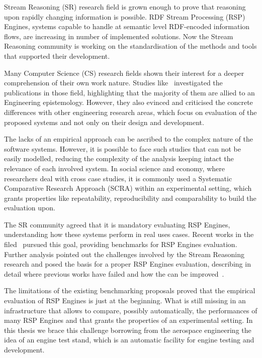 Stream Reasoning (SR) research field is grown enough to prove that reasoning upon rapidly changing information is possible. RDF Stream Processing (RSP) Engines, systems capable to handle at semantic level RDF-encoded information flows, are increasing in number of implemented solutions. Now the Stream Reasoning community is working on the standardisation of the methods and tools that supported their development. 

Many Computer Science (CS) research fields shown their interest for a deeper comprehension of their own work nature. Studies like~\cite{Tichy:1995:EEC:209090.209093, Wainer:2009:EEC:1518331.1518552} investigated the publications in those field, highlighting that the majority of them are allied to an Engineering epistemology. However, they also evinced and criticised the concrete differences with other engineering research areas, which focus on evaluation of the proposed systems and not only on their design and development. 

The lacks of an empirical approach can be ascribed to the complex nature of the software systems. However, it is possible to face such studies that can not be easily modelled, reducing the complexity of the analysis keeping intact the relevance of each involved system. In social science and economy, where researchers deal with cross case studies, it is commonly used a Systematic Comparative Research Approach (SCRA) within an experimental setting, which grants properties like repeatability, reproducibility and comparability to build the evaluation upon.

The SR community agreed that it is mandatory evaluating RSP Engines, understanding how these systems perform in real uses cases. Recent works in the filed~\cite{Zhang2012, LePhuoc2012c, DBLP:conf/semweb/DellAglioCBCV13} pursued this goal, providing benchmarks for RSP Engines evaluation. Further analysis pointed out the challenges involved by the Stream Reasoning research and posed the basis for a proper RSP Engines evaluation, describing in detail where previous works have failed and how the can be improved~\cite{DBLP:conf/esws/ScharrenbachUMVB13}.

The limitations of the existing benchmarking proposals proved that the empirical evaluation of RSP Engines is just at the beginning. What is still missing in an infrastructure that allows to compare, possibly automatically, the performances of many RSP Engines and that grants the properties of an experimental setting. In this thesis we brace this challenge borrowing from the aerospace engineering the idea of an engine test stand, which is an automatic facility for engine testing and development. 

